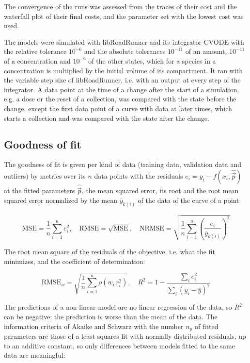 The convergence of the runs was assessed from the traces of their cost and the waterfall plot of their final costs, and the parameter set with the lowest cost was used.

The models were simulated with libRoadRunner \cite{Welsh2023} and its integrator CVODE \cite{Hindmarsh2005} with the relative tolerance $10^{-6}$ and the absolute tolerances $10^{-11}$ of an amount, $10^{-11}$ of a concentration and $10^{-6}$ of the other states, which for a species in a concentration is multiplied by the initial volume of its compartment. It ran with the variable step size of libRoadRunner, i.e. with an output at every step of the integrator. A data point at the time of a change after the start of a simulation, e.g. a dose or the reset of a collection, was compared with the state before the change, except the first data point of a curve with data at later times, which starts a collection and was compared with the state after the change.

\subsection{Goodness of fit}

The goodness of fit is given per kind of data (training data, validation data and outliers) by metrics over its $n$ data points with the residuals $e_i = y_i - f(x_i, \hat{\vec{p}})$ at the fitted parameters $\hat{\vec{p}}$, the mean squared error, its root and the root mean squared error normalized by the mean $\overline{y}_{k(i)}$ of the data of the curve of a point:

\begin{equation}
\mathrm{MSE} = \frac{1}{n} \sum_{i=1}^{n} e_i^2, \quad \mathrm{RMSE} = \sqrt{\mathrm{MSE}}, \quad \mathrm{NRMSE} = \sqrt{\frac{1}{n} \sum_{i=1}^{n} \left(\frac{e_i}{\overline{y}_{k(i)}}\right)^2}
\end{equation}

The root mean square of the residuals of the objective, i.e. what the fit minimizes, and the coefficient of determination:

\begin{equation}
\mathrm{RMSE}_w = \sqrt{\frac{1}{n} \sum_{i=1}^{n} \rho\left(w_i\, r_i^2\right)}, \quad R^2 = 1 - \frac{\sum_{i} e_i^2}{\sum_{i} \left(y_i - \overline{y}\right)^2}
\end{equation}

The predictions of a non-linear model are no linear regression of the data, so $R^2$ can be negative: the prediction is worse than the mean of the data. The information criteria of Akaike \cite{Akaike1974} and Schwarz \cite{Schwarz1978} with the number $n_p$ of fitted parameters are those of a least squares fit with normally distributed residuals, up to an additive constant, so only differences between models fitted to the same data are meaningful:

